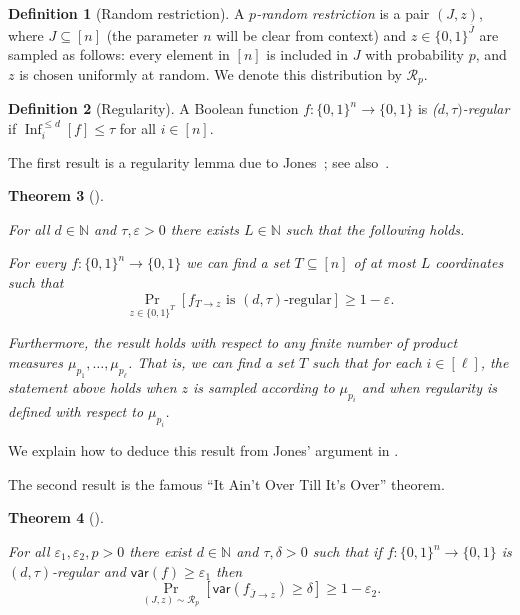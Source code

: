 \documentclass{article}
\newtheorem{theorem}{Theorem}[section]
\theoremstyle{definition}
\newtheorem{definition}[theorem]{Definition}
\theoremstyle{remark}
\providecommand{\rr}[1]{\mathcal{R}_{#1}}
\providecommand{\V}[1]{\mathsf{var}(#1)}
\DeclareMathOperator{\Inf}{Inf}
\newcommand\eps{\varepsilon}
\renewcommand\epsilon{\eps}
\renewcommand\geq{\geqslant}
\renewcommand\leq{\leqslant}
\begin{document}
\begin{definition}[Random restriction]
A \emph{$p$-random restriction} is a pair $(J,z)$, where $J \subseteq [n]$ (the parameter $n$ will be clear from context) and $z \in \{0,1\}^{\overline{J}}$ are sampled as follows: every element in $[n]$ is included in $J$ with probability $p$, and $z$ is chosen uniformly at random.
We denote this distribution by $\rr{p}$.
\end{definition}

\begin{definition}[Regularity]
A Boolean function $f\colon \{0,1\}^n \to \{0,1\}$ is \emph{($d,\tau)$-regular} if $\Inf_i^{\leq d}[f] \leq \tau$ for all $i \in [n]$.
\end{definition}

The first result is a regularity lemma due to Jones~\cite{Jones}; see also~\cite[Lemma 2.7]{Mossel2020}.

\begin{theorem}[\cite{Jones}]
\label{thm:jones}

For all $d \in \mathbb{N}$ and $\tau,\epsilon > 0$ there exists $L \in \mathbb{N}$ such that the following holds.

For every $f\colon \{0,1\}^n \to \{0,1\}$ we can find a set $T \subseteq [n]$ of at most $L$ coordinates such that
\[
 \Pr_{z \in \{0,1\}^T}[f_{T \to z} \text{ is $(d,\tau)$-regular}] \geq 1-\epsilon.
\]

Furthermore, the result holds with respect to any finite number of product measures $\mu_{p_1},\ldots,\mu_{p_\ell}$. That is, we can find a set $T$ such that for each $i \in [\ell]$, the statement above holds when $z$ is sampled according to $\mu_{p_i}$ and when regularity is defined with respect to $\mu_{p_i}$.
\end{theorem}

We explain how to deduce this result from Jones' argument in .

The second result is the famous ``It Ain't Over Till It's Over'' theorem.

\begin{theorem}[\cite{MOO}] \label{thm:it-aint-over}

For all $\epsilon_1,\epsilon_2,p > 0$ there exist $d \in \mathbb{N}$ and $\tau,\delta > 0$ such that if $f\colon \{0,1\}^n \to \{0,1\}$ is $(d,\tau)$-regular and $\V{f} \geq \epsilon_1$ then
\[
 \Pr_{(J,z) \sim \rr{p}}[\V{f_{\overline{J}\to z}} \geq \delta] \geq 1-\epsilon_2.
\]
\end{theorem}
\end{document}
